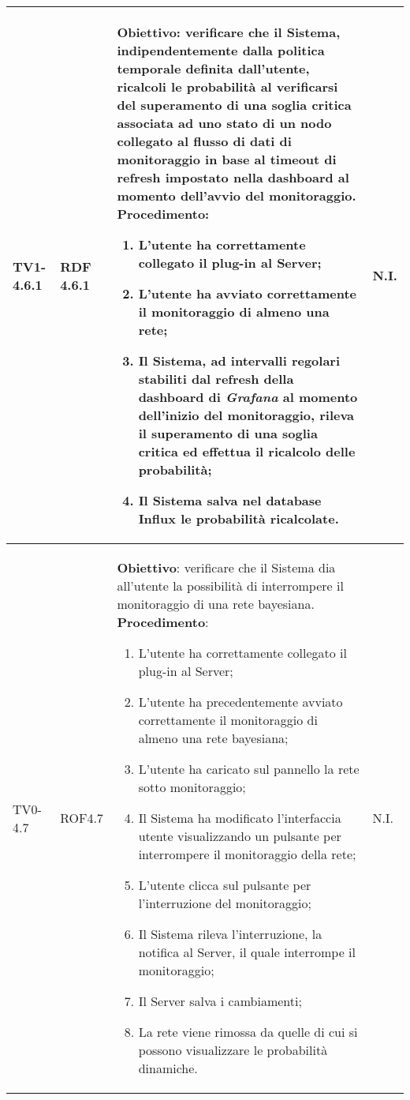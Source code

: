 \begin{longtable}{|C{.15\textwidth}|C{.13\textwidth}|m{.65\textwidth}|C{.08\textwidth}|}
TV1-4.6.1 & RDF 4.6.1 &
	\textbf{Obiettivo}: verificare che il Sistema, indipendentemente dalla politica temporale definita dall'utente, ricalcoli le probabilità al verificarsi del superamento di una soglia critica associata ad uno stato di un nodo collegato al flusso di dati di monitoraggio in base al timeout di refresh impostato nella dashboard al momento dell'avvio del monitoraggio. \newline
	\textbf{Procedimento}:
	\begin{enumerate}
		\item L'utente ha correttamente collegato il plug-in al Server;
		\item L'utente ha avviato correttamente il monitoraggio di almeno una rete;
		\item Il Sistema, ad intervalli regolari stabiliti dal refresh della dashboard di \textit{Grafana} al momento dell'inizio del monitoraggio, rileva il superamento di una soglia critica ed effettua il ricalcolo delle probabilità;
		\item Il Sistema salva nel database Influx le probabilità ricalcolate.
	\end{enumerate}
	& N.I. \\
\hline

TV0-4.7 & ROF4.7 &
	\textbf{Obiettivo}: verificare che il Sistema dia all'utente la possibilità di interrompere il monitoraggio di una rete bayesiana. \newline
	\textbf{Procedimento}:
	\begin{enumerate}
		\item L'utente ha correttamente collegato il plug-in al Server;
		\item L'utente ha precedentemente avviato correttamente il monitoraggio di almeno una rete bayesiana;
		\item L'utente ha caricato sul pannello la rete sotto monitoraggio;
		\item Il Sistema ha modificato l'interfaccia utente visualizzando un pulsante per interrompere il monitoraggio della rete;
		\item L'utente clicca sul pulsante per l'interruzione del monitoraggio;
		\item Il Sistema rileva l'interruzione, la notifica al Server, il quale interrompe il monitoraggio;
		\item Il Server salva i cambiamenti;
		\item La rete viene rimossa da quelle di cui si possono visualizzare le probabilità dinamiche.
	\end{enumerate}
	& N.I. \\
\hline


\end{longtable}
